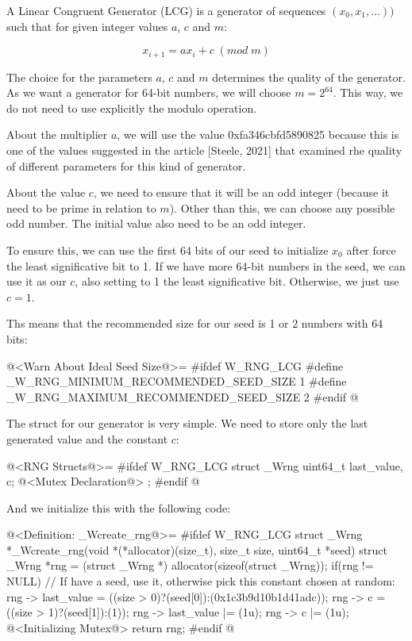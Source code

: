 

A Linear Congruent Generator (LCG) is a generator of sequences $(x_0,
x_1, \ldots))$ such that for given integer values $a$, $c$ and $m$:

$$
x_{i+1}=ax_i+c\; (mod\; m)
$$

The choice for the parameters $a$, $c$ and $m$ determines the quality
of the generator. As we want a generator for 64-bit numbers, we will
choose $m=2^{64}$. This way, we do not need to use explicitly the
modulo operation.

About the multiplier $a$, we will use the value 0xfa346cbfd5890825
because this is one of the values suggested in the article [Steele,
2021] that examined rhe quality of different parameters for this kind
of generator.

About the value $c$, we need to ensure that it will be an odd integer
(because it need to be prime in relation to $m$). Other than this, we
can choose any possible odd number. The initial value also need to be
an odd integer.

To ensure this, we can use the first 64 bits of our seed to initialize
$x_0$ after force the least significative bit to 1. If we have more
64-bit numbers in the seed, we can use it as our $c$, also setting to
1 the least significative bit. Otherwise, we just use $c=1$.


Ths means that the recommended size for our seed is 1 or 2 numbers
with 64 bits:

\iniciocodigo
@<Warn About Ideal Seed Size@>=
#ifdef W_RNG_LCG
#define _W_RNG_MINIMUM_RECOMMENDED_SEED_SIZE  1
#define _W_RNG_MAXIMUM_RECOMMENDED_SEED_SIZE  2
#endif
@
\fimcodigo

The struct for our generator is very simple. We need to store only the
last generated value and the constant $c$:

\iniciocodigo
@<RNG Structs@>=
#ifdef W_RNG_LCG
struct _Wrng{
  uint64_t last_value, c;
  @<Mutex Declaration@>
};
#endif
@
\fimcodigo

And we initialize this with the following code:

\iniciocodigo
@<Definition: \_Wcreate\_rng@>=
#ifdef W_RNG_LCG
struct _Wrng *_Wcreate_rng(void *(*allocator)(size_t), size_t size,
                           uint64_t *seed){
  struct _Wrng *rng = (struct _Wrng *) allocator(sizeof(struct _Wrng));
  if(rng != NULL){
    // If have a seed, use it, otherwise pick this constant chosen at random:
    rng -> last_value = ((size > 0)?(seed[0]):(0x1c3b9d10b1d41adc));
    rng -> c = ((size > 1)?(seed[1]):(1));
    rng -> last_value |= (1u);
    rng -> c |= (1u);
    @<Initializing Mutex@>
  }
  return rng;
}
#endif
@
\fimcodigo

